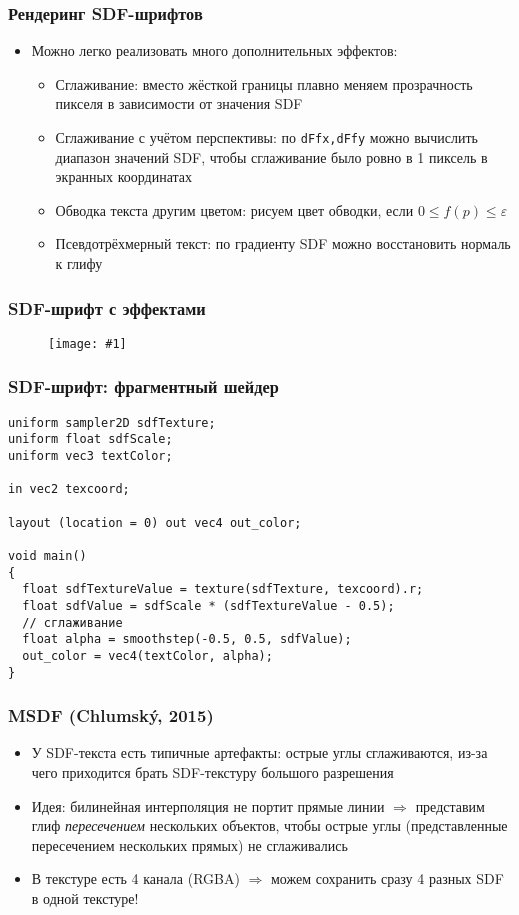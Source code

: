 \documentclass{beamer}
\newcommand{\slideimage}[1]{
  \begin{figure}
    \begin{adjustbox}{width=\textwidth, totalheight=\textheight-2\baselineskip-2\baselineskip,keepaspectratio}
      \texttt{[image: \#1]}
    \end{adjustbox}
  \end{figure}
}
\begin{document}
\begin{frame}[fragile]
\frametitle{Рендеринг SDF-шрифтов}
\begin{itemize}
\item Можно легко реализовать много дополнительных эффектов:
\pause
\begin{itemize}
\item Сглаживание: вместо жёсткой границы плавно меняем прозрачность пикселя в зависимости от значения SDF
\pause
\item Сглаживание с учётом перспективы: по \verb|dFfx,dFfy| можно вычислить диапазон значений SDF, чтобы сглаживание было ровно в 1 пиксель в экранных координатах
\pause
\item Обводка текста другим цветом: рисуем цвет обводки, если \begin{math}0 \leq f(p) \leq \varepsilon\end{math}
\pause
\item Псевдотрёхмерный текст: по градиенту SDF можно восстановить нормаль к глифу
\end{itemize}
\end{itemize}
\end{frame}

\begin{frame}[fragile]
\frametitle{SDF-шрифт с эффектами}
\slideimage{sdf-effects.png}
\end{frame}

\begin{frame}[fragile]
\frametitle{SDF-шрифт: фрагментный шейдер}
\fontsize{10pt}{10pt}
\begin{verbatim}
uniform sampler2D sdfTexture;
uniform float sdfScale;
uniform vec3 textColor;

in vec2 texcoord;

layout (location = 0) out vec4 out_color;

void main()
{
  float sdfTextureValue = texture(sdfTexture, texcoord).r;
  float sdfValue = sdfScale * (sdfTextureValue - 0.5);
  // сглаживание
  float alpha = smoothstep(-0.5, 0.5, sdfValue);
  out_color = vec4(textColor, alpha);
}
\end{verbatim}
\end{frame}

\begin{frame}[fragile]
\frametitle{MSDF (Chlumský, 2015)}
\begin{itemize}
\item У SDF-текста есть типичные артефакты: острые углы сглаживаются, из-за чего приходится брать SDF-текстуру большого разрешения
\pause
\item Идея: билинейная интерполяция не портит прямые линии \begin{math}\Rightarrow\end{math} представим глиф \textit{пересечением} нескольких объектов, чтобы острые углы (представленные пересечением нескольких прямых) не сглаживались
\pause
\item В текстуре есть 4 канала (RGBA) \begin{math}\Rightarrow\end{math} можем сохранить сразу 4 разных SDF в одной текстуре!
\end{itemize}
\end{frame}
\end{document}
